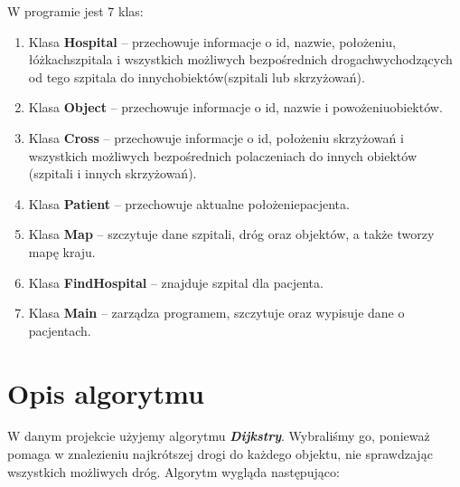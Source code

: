 ﻿\documentclass{article}
\begin{document}
\noindent W programie jest 7 klas:

\begin{enumerate}
\item  Klasa \textbf{Hospital} -- przechowuje informacje o id, nazwie, po{\l}o\.{z}eniu, {\l}\'{o}\.{z}kachszpitala i wszystkich mo\.{z}liwych bezpo\'{s}rednich drogachwychodz\k{a}cych od tego szpitala do innychobiekt\'{o}w(szpitali lub skrzy\.{z}owa\'{n}). 

\item  Klasa \textbf{Object} -- przechowuje informacje o id, nazwie i powo\.{z}eniuobiekt\'{o}w.

\item  Klasa \textbf{Cross} -- przechowuje informacje o id, po{\l}o\.{z}eniu skrzy\.{z}owa\'{n} i wszystkich mo\.{z}liwych bezpo\'{s}rednich polaczeniach do innych obiekt\'{o}w (szpitali i innych skrzy\.{z}owa\'{n}). 

\item  Klasa \textbf{Patient} -- przechowuje aktualne po{\l}o\.{z}eniepacjenta. 

\item  Klasa \textbf{Map} -- szczytuje dane szpitali, dr\'{o}g oraz objekt\'{o}w, a tak\.{z}e tworzy map\k{e} kraju.

\item  Klasa \textbf{FindHospital} -- znajduje szpital dla pacjenta. 

\item  Klasa \textbf{Main} -- zarz\k{a}dza programem, szczytuje oraz wypisuje dane o pacjentach.
\end{enumerate}

\noindent 
\section{Opis algorytmu}

\noindent W danym projekcie u\.{z}yjemy algorytmu \textbf{\textit{Dijkstry}}. Wybrali\'{s}my go, poniewa\.{z} pomaga w znalezieniu najkr\'{o}tszej drogi do ka\.{z}dego objektu, nie sprawdzaj\k{a}c wszystkich mo\.{z}liwych dr\'{o}g. Algorytm wygl\k{a}da nast\k{e}puj\k{a}co:
\end{document}
